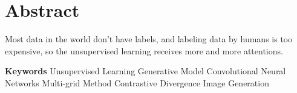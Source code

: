 \chapter*{Abstract}
\timesnewroman

Most data in the world don't have labels, and labeling data by humans is too expensive, so the unsupervised learning receives more and more attentions. 

{
    \vspace{1em}
    \setlength{\parindent}{0em}
    \textbf{Keywords} \; Unsupervised Learning \; Generative Model \; Convolutional Neural Networks \; Multi-grid Method \; Contrastive Divergence \; Image Generation \; \par
}
